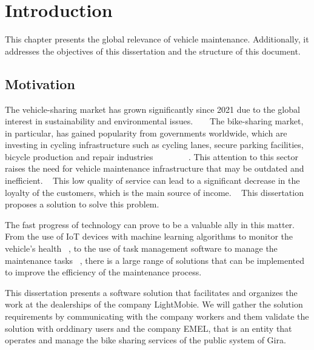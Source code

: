 \chapter{Introduction}%
\label{chapter:introduction}

\begin{introduction}
This chapter presents the global relevance of vehicle maintenance. Additionally, it addresses the objectives of this dissertation and the structure of this document.
\end{introduction} 


\section{Motivation}

The vehicle-sharing market has grown significantly since 2021 due to the global interest in sustainability and environmental issues. ~\cite{cohesionOpenData} ~\cite{bike_data_businessresearch}
The bike-sharing market, in particular, has gained popularity from governments worldwide, which are investing in cycling infrastructure such as cycling lanes, secure parking facilities, bicycle production and repair industries ~\cite{Clercq2023} ~\cite{Cerro2024} ~\cite{European_declararion_on_cycling} ~\cite{bike_data_businessresearch} ~\cite{cohesionOpenData}.
This attention to this sector raises the need for vehicle maintenance infrastructure that may be outdated and inefficient. ~\cite{MAS_MOTORS}
This low quality of service can lead to a significant decrease in the loyalty of the customers, which is the main source of income. ~\cite{Setting_the_after_sale_process}
This dissertation proposes a solution to solve this problem.

The fast progress of technology can prove to be a valuable ally in this matter. 
From the use of IoT devices with machine learning algorithms to monitor the vehicle's health ~\cite{Vasavi2021}, 
to the use of task management software to manage the maintenance tasks ~\cite{MAS_MOTORS}, 
there is a large range of solutions that can be implemented to improve the efficiency of the maintenance process.

This dissertation presents a software solution that facilitates and organizes the work at the dealerships of the company LightMobie. We will gather the solution requirements by communicating with the company workers and them validate the solution with orddinary users and the company EMEL, that is an entity that operates and manage the bike sharing services of the public system of Gira.


